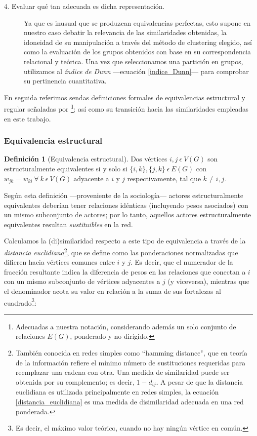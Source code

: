 \documentclass[letterpaper, 11pt]{book}
\theoremstyle{definition}
\newtheorem{definition}{Definición}[chapter]
\theoremstyle{remark}
\begin{document}
\begin{description}
    
    \item[4. Evaluar qué tan adecuada es dicha representación.] 
    Ya que es inusual que se produzcan equivalencias perfectas, esto supone en nuestro caso debatir la relevancia de las similaridades obtenidas, la idoneidad de su manipulación a través del método de clustering elegido, así como la evaluación de los grupos obtenidos con base en su correspondencia relacional y teórica. 
    Una vez que seleccionamos una partición en grupos, utilizamos al \emph{índice de Dunn} ---ecuación \ref{indice_Dunn}--- para comprobar su pertinencia cuantitativa. 
\end{description}

En seguida referimos sendas definiciones formales de equivalencias estructural y regular señaladas por \citet{1994_Wasserman_SNA}\footnote{
    Adecuadas a nuestra notación, considerando además un solo conjunto de relaciones $E(G)$, ponderado y no dirigido.
}; así como su transición hacia las similaridades empleadas en este trabajo. 


\subsubsection{Equivalencia estructural}
\label{sec:EquivalenciaEstructural}


\begin{definition}[Equivalencia estructural]
\label{EquivalenciaEstructural}
    Dos vértices $i, j \ \epsilon \ V(G)$ son estructuralmente equivalentes si y solo si $\{i,k\}, \{j,k\} \ \epsilon \ E(G) $ con $w_{jk} = w_{ki} \ \forall \ k \ \epsilon \ V(G)$ adyacente a $i$ y $j$ respectivamente, tal que $k \neq i,j$.
\end{definition}

Según esta definición ---proveniente de la sociología--- actores estructuralmente equivalentes deberían tener relaciones idénticas (incluyendo pesos asociados) con un mismo subconjunto de actores; por lo tanto, aquellos actores estructuralmente equivalentes resultan \emph{sustituibles} en la red. 

Calculamos la (di)similaridad respecto a este tipo de equivalencia a través de la \emph{distancia euclidiana}\footnote{
    También conocida en redes simples como ``hamming distance'', que en teoría de la información refiere el mínimo número de sustituciones requeridas para reemplazar una cadena con otra. 
    Una medida de similaridad puede ser obtenida por su complemento; es decir, $1-d_{ij}$.
    A pesar de que la distancia euclidiana es utilizada principalmente en redes simples, la ecuación \ref{distancia_euclidiana} es una medida de disimilaridad adecuada en una red ponderada. 
}, 
que se define como las ponderaciones normalizadas que difieren hacia vértices comunes entre $i$ y $j$. 
Es decir, que el numerador de la fracción resultante indica la diferencia de pesos en las relaciones que conectan a $i$ con un mismo subconjunto de vértices adyacentes a $j$ (y viceversa), mientras que el denominador acota su valor en relación a la suma de sus fortalezas al cuadrado\footnote{
    Es decir, el máximo valor teórico, cuando no hay ningún vértice en común.
}: 
\end{document}
